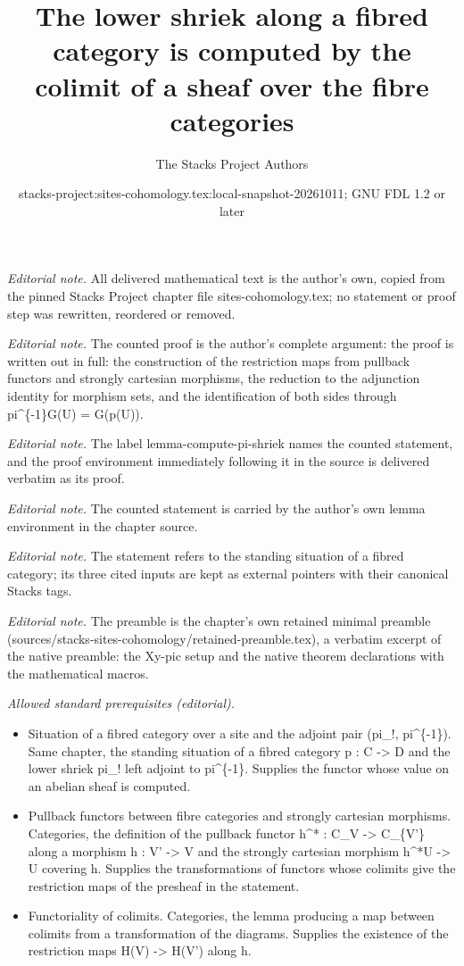 \documentclass[10pt,a4paper]{amsart}
\title{The lower shriek along a fibred category is computed by the colimit of a sheaf over the fibre categories}
\author{The Stacks Project Authors}
\date{stacks-project:sites-cohomology.tex:local-snapshot-20261011; GNU FDL 1.2 or later}
\theoremstyle{plain}
\theoremstyle{definition}
\theoremstyle{remark}
\numberwithin{equation}{subsection}
\begin{document}
\maketitle
\noindent\textit{Editorial note.} All delivered mathematical text is the author's own, copied from the pinned Stacks Project chapter file sites-cohomology.tex; no statement or proof step was rewritten, reordered or removed.\par\medskip
\noindent\textit{Editorial note.} The counted proof is the author's complete argument: the proof is written out in full: the construction of the restriction maps from pullback functors and strongly cartesian morphisms, the reduction to the adjunction identity for morphism sets, and the identification of both sides through pi\textasciicircum{}\{-1\}G(U) = G(p(U)).\par\medskip
\noindent\textit{Editorial note.} The label lemma-compute-pi-shriek names the counted statement, and the proof environment immediately following it in the source is delivered verbatim as its proof.\par\medskip
\noindent\textit{Editorial note.} The counted statement is carried by the author's own lemma environment in the chapter source.\par\medskip
\noindent\textit{Editorial note.} The statement refers to the standing situation of a fibred category; its three cited inputs are kept as external pointers with their canonical Stacks tags.\par\medskip
\noindent\textit{Editorial note.} The preamble is the chapter's own retained minimal preamble (sources/stacks-sites-cohomology/retained-preamble.tex), a verbatim excerpt of the native preamble: the Xy-pic setup and the native theorem declarations with the mathematical macros.\par\medskip
\noindent\textit{Allowed standard prerequisites (editorial).}\begin{itemize}
\item Situation of a fibred category over a site and the adjoint pair (pi\_!, pi\textasciicircum{}\{-1\}). Same chapter, the standing situation of a fibred category p : C -> D and the lower shriek pi\_! left adjoint to pi\textasciicircum{}\{-1\}. Supplies the functor whose value on an abelian sheaf is computed.
\item Pullback functors between fibre categories and strongly cartesian morphisms. Categories, the definition of the pullback functor h\textasciicircum{}* : C\_V -> C\_\{V'\} along a morphism h : V' -> V and the strongly cartesian morphism h\textasciicircum{}*U -> U covering h. Supplies the transformations of functors whose colimits give the restriction maps of the presheaf in the statement.
\item Functoriality of colimits. Categories, the lemma producing a map between colimits from a transformation of the diagrams. Supplies the existence of the restriction maps H(V) -> H(V') along h.
\end{itemize}\medskip
\end{document}
